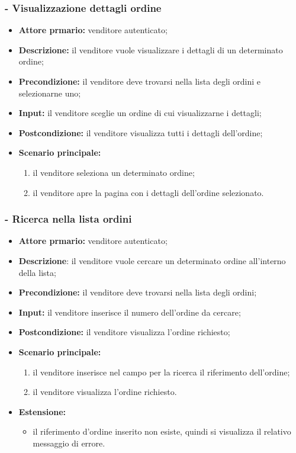 \stepsubUserCase
\subsubsection{- Visualizzazione dettagli ordine}
\begin{itemize}
    \item \textbf{Attore prmario:} venditore autenticato;
    \item \textbf{Descrizione:} il venditore vuole visualizzare i dettagli di un determinato ordine;
    \item \textbf{Precondizione:} il venditore deve trovarsi nella lista degli ordini e selezionarne uno;
    \item \textbf{Input:} il venditore sceglie un ordine di cui visualizzarne i dettagli;
    \item \textbf{Postcondizione:} il venditore visualizza tutti i dettagli dell'ordine;
    \item \textbf{Scenario principale:}
          \begin{enumerate}
              \item il venditore seleziona un determinato ordine;
              \item il venditore apre la pagina con i dettagli dell'ordine selezionato.
          \end{enumerate}
\end{itemize}

\stepsubUserCase
\subsubsection{- Ricerca nella lista ordini}
\begin{itemize}
    \item \textbf{Attore prmario:} venditore autenticato;
    \item \textbf{Descrizione}: il venditore vuole cercare un determinato ordine all'interno della lista;
    \item \textbf{Precondizione:} il venditore deve trovarsi nella lista degli ordini;
    \item \textbf{Input:} il venditore inserisce il numero dell'ordine da cercare;
    \item \textbf{Postcondizione:} il venditore visualizza l'ordine richiesto;
    \item \textbf{Scenario principale:}
        \begin{enumerate}
            \item il venditore inserisce nel campo per la ricerca il riferimento dell'ordine;
            \item il venditore visualizza l'ordine richiesto.
        \end{enumerate}
    \item \textbf{Estensione:}
    \begin{itemize}
        \item il riferimento d'ordine inserito non esiste, quindi si visualizza il relativo messaggio di errore.
    \end{itemize}
\end{itemize}


